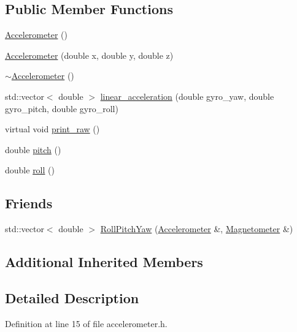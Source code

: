 \subsection*{Public Member Functions}
\begin{DoxyCompactItemize}
\item 
\hyperlink{classsensor_1_1_accelerometer_a6615c08a2b256bd1e1f2ddc09e9337cb}{Accelerometer} ()
\item 
\hyperlink{classsensor_1_1_accelerometer_a375d0a6727812144705808e10039cba2}{Accelerometer} (double x, double y, double z)
\item 
\hyperlink{classsensor_1_1_accelerometer_a03b06044198fcb5c39f9b83c471c5fd2}{$\sim$\+Accelerometer} ()
\item 
std\+::vector$<$ double $>$ \hyperlink{classsensor_1_1_accelerometer_a53257e59c7db9c75f3df41039d5b5b6d}{linear\+\_\+acceleration} (double gyro\+\_\+yaw, double gyro\+\_\+pitch, double gyro\+\_\+roll)
\item 
virtual void \hyperlink{classsensor_1_1_accelerometer_a172c1bfe5d20071d5f3542a717797afa}{print\+\_\+raw} ()
\item 
double \hyperlink{classsensor_1_1_accelerometer_afd2bf373d1142b305cc16c9020ae01e8}{pitch} ()
\item 
double \hyperlink{classsensor_1_1_accelerometer_a63e28e79c1b08471c86f163033b04c5d}{roll} ()
\end{DoxyCompactItemize}
\subsection*{Friends}
\begin{DoxyCompactItemize}
\item 
std\+::vector$<$ double $>$ \hyperlink{classsensor_1_1_accelerometer_af6581f59b9f71cabfa36a46d177deb5f}{Roll\+Pitch\+Yaw} (\hyperlink{classsensor_1_1_accelerometer}{Accelerometer} \&, \hyperlink{classsensor_1_1_magnetometer}{Magnetometer} \&)
\end{DoxyCompactItemize}
\subsection*{Additional Inherited Members}


\subsection{Detailed Description}


Definition at line 15 of file accelerometer.\+h.



